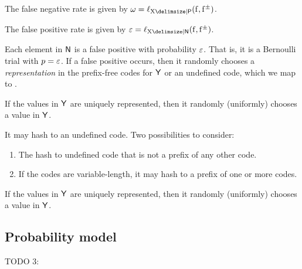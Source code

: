 \documentclass[11pt,final,hidelinks]{article}
\providecommand{\Nothing}{\mathsf{nothing}}
\begin{document}
The false negative rate is given by $\fnrate = \Fun{\ell}_{\RV{X} \Given \PlainSet{P}}(\Fun{f}, \Fun{\AT{f}})$.

The false positive rate is given by $\fprate = \Fun{\ell}_{\RV{X} \Given \PlainSet{N}}(\Fun{f}, \Fun{\AT{f}})$.

Each element in $\PlainSet{N}$ is a false positive with probability $\varepsilon$.
That is, it is a Bernoulli trial with $p = \varepsilon$.
If a false positive occurs, then it randomly chooses a \emph{representation} in the prefix-free codes for $\Set{Y}$ or an undefined code, which we map to \Nothing.

If the values in $\Set{Y}$ are uniquely represented, then it randomly (uniformly) chooses a value in $\Set{Y}$.

It may hash to an undefined code.
Two possibilities to consider:
\begin{enumerate}
	\item The hash to undefined code that is not a prefix of any other code.
	\item If the codes are variable-length, it may hash to a prefix of one or more codes.
\end{enumerate}

If the values in $\Set{Y}$ are uniquely represented, then it randomly (uniformly) chooses a value in $\Set{Y}$.








\subsection{Probability model}

TODO 3:
\end{document}
